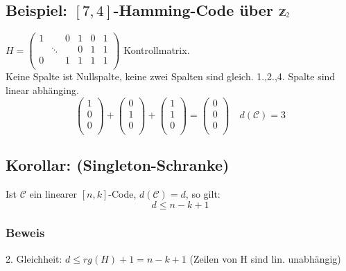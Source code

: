 \subsection{Beispiel: $[7,4]$-Hamming-Code \"uber $\Z_2$}
$H =
\begin{pmatrix}
1 & & 0 & 1 & 0 & 1\\
   &\ddots &    & 0 & 1 & 1\\
0 & & 1 & 1 & 1 & 1\\
\end{pmatrix}$ Kontrollmatrix.\\
Keine Spalte ist Nullspalte, keine zwei Spalten sind  gleich. 1.,2.,4. Spalte sind linear abh\"anging.
\[
	\begin{pmatrix}
	1\\
	0\\
	0\\
	\end{pmatrix} +
	\begin{pmatrix}
	0\\
	1\\
	0\\
	\end{pmatrix} +
	\begin{pmatrix}
	1\\
	1\\
	0\\
	\end{pmatrix} =
	\begin{pmatrix}
	0\\
	0\\
	0\\
	\end{pmatrix} \quad d(\mathcal{C})=3
\]
\subsection{Korollar: (Singleton-Schranke)}
Ist $\mathcal{C}$ ein linearer $[n,k]$-Code, $d(\mathcal{C})=d$, so gilt:
\[
	d \leq n-k + 1
\]
\subsubsection{Beweis}
2. Gleichheit: $d \leq rg(H)+1=n-k+1$ (Zeilen von H sind lin. unabh\"angig)
